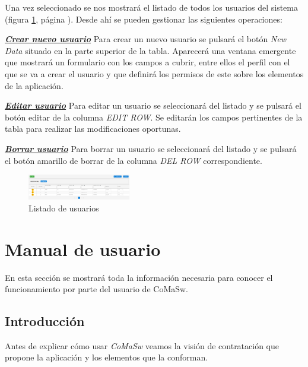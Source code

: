 Una vez seleccionado se nos mostrará el listado de todos los usuarios del sistema (figura
\ref{fig:listado-usuarios}, página \pageref{fig:listado-usuarios}). Desde ahí se pueden gestionar las siguientes operaciones:\newline


\underline{\textsl{\textbf{Crear nuevo usuario}}}
Para crear un nuevo usuario se pulsará el botón \emph{New Data} situado en la parte superior de la tabla. Aparecerá una ventana emergente que mostrará un formulario con los campos a cubrir, entre ellos el perfil con el que se va a crear el usuario y que definirá los permisos de este sobre los elementos de la aplicación.


\underline{\textsl{\textbf{Editar usuario}}}
Para editar un usuario se seleccionará del listado y se pulsará el botón editar de la columna \emph{EDIT ROW}. Se editarán los campos pertinentes de la tabla para realizar las modificaciones oportunas. 

\underline{\textsl{\textbf{Borrar usuario}}}
Para borrar un usuario se seleccionará del listado y se pulsará el botón amarillo de borrar de la columna \emph{DEL ROW} correspondiente.\newline


\begin{figure}[H]
  \centering
  \includegraphics[width=0.40\textwidth]{imaxes/gestion-usuarios-02.png}
  \caption{Listado de usuarios}
  \label{fig:listado-usuarios}
\end{figure}



\section{Manual de usuario}
\label{sec:manual-usuario}

En esta sección se mostrará toda la información necesaria para conocer el funcionamiento por parte del usuario de CoMaSw.


\subsection{Introducción}
\label{sub:introduccion}

Antes de explicar cómo usar \emph{CoMaSw} veamos la visión de contratación que propone la aplicación y los elementos que la conforman.



